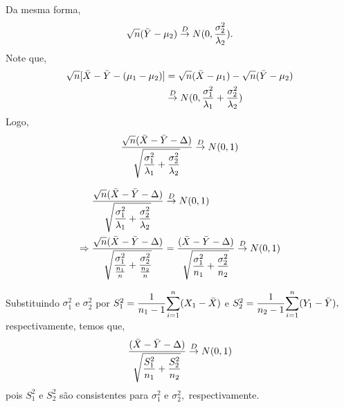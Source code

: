 \documentclass[12pt]{beamer}
\begin{document}
\begin{frame}{}
\begin{block}{}
\justifying
Da mesma forma,
\begin{align*}
\sqrt{n}(\Bar{Y}-\mu_{2})\overset{D}{\rightarrow} N(0,\dfrac{\sigma_{2}^{2}}{\lambda_{2}}).
\end{align*}
Note que,
\begin{align*}
\sqrt{n}[\Bar{X}-\Bar{Y}-(\mu_{1}-\mu_{2})]&=\sqrt{n}(\Bar{X}-\mu_{1})-\sqrt{n}(\Bar{Y}-\mu_{2})\\
&\overset{D}{\rightarrow} N(0,\dfrac{\sigma_{1}^{2}}{\lambda_{1}}+\dfrac{\sigma_{2}^{2}}{\lambda_{2}})
\end{align*}
Logo,
\begin{align*}
\dfrac{\sqrt{n}(\Bar{X}-\Bar{Y}-\Delta)}{\sqrt{\dfrac{\sigma_{1}^{2}}{\lambda_{1}}+\dfrac{\sigma_{2}^{2}}{\lambda_{2}}}}\overset{D}{\rightarrow} N(0,1)
\end{align*}
\end{block}
\end{frame}

\begin{frame}{}
\begin{block}{}
\justifying
\begin{align*}
\dfrac{\sqrt{n}(\Bar{X}-\Bar{Y}-\Delta)}{\sqrt{\dfrac{\sigma_{1}^{2}}{\lambda_{1}}+\dfrac{\sigma_{2}^{2}}{\lambda_{2}}}}&\overset{D}{\rightarrow} N(0,1)\\
\Rightarrow 
\dfrac{\sqrt{n}(\Bar{X}-\Bar{Y}-\Delta)}{\sqrt{\dfrac{\sigma_{1}^{2}}{\frac{n_{1}}{n}}+\dfrac{\sigma_{2}^{2}}{\frac{n_{2}}{n}}}}&=
\dfrac{(\Bar{X}-\Bar{Y}-\Delta)}{\sqrt{\dfrac{\sigma_{1}^{2}}{n_{1}}+\dfrac{\sigma_{2}^{2}}{n_{2}}}}
\overset{D}{\rightarrow} N(0,1)
\end{align*}
\end{block}
\end{frame}

\begin{frame}{}
\begin{block}{}
\justifying
Substituindo $\sigma_{1}^{2}$ e $\sigma_{2}^{2}$ por $S_{1}^{2}=\dfrac{1}{n_{1}-1}{\displaystyle \sum_{i=1}^{n}} (X_{1}-\Bar{X})$ e $S_{2}^{2}=\dfrac{1}{n_{2}-1}{\displaystyle \sum_{i=1}^{n}} (Y_{1}-\Bar{Y}),$ respectivamente, temos que,
\begin{align*}
\dfrac{(\Bar{X}-\Bar{Y}-\Delta)}{\sqrt{\dfrac{S_{1}^{2}}{n_{1}}+\dfrac{S_{2}^{2}}{n_{2}}}} \overset{D}{\rightarrow} N(0,1)   
\end{align*}
pois $S_{1}^{2}$ e $S_{2}^{2}$ são consistentes para $\sigma_{1}^{2}$ e $\sigma_{2}^{2},$ respectivamente.
\end{block}
\end{frame}
\end{document}

